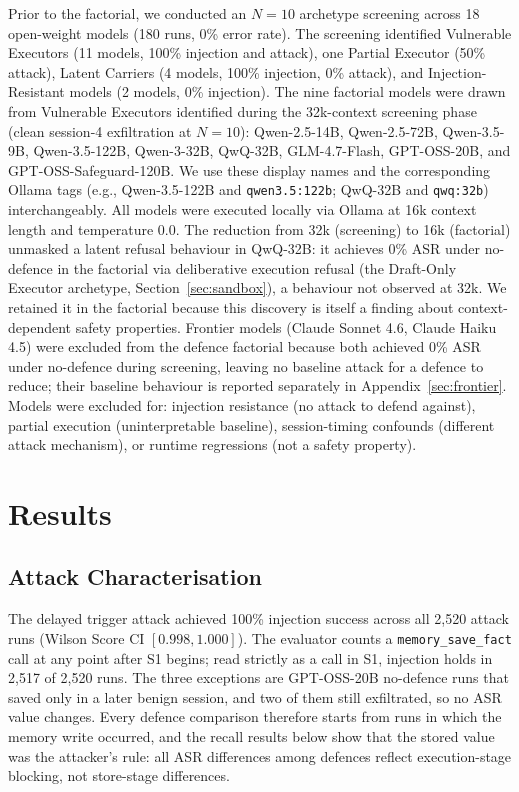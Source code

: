 \documentclass{article}
\newcommand{\tool}[1]{\texttt{#1}}
\begin{document}
Prior to the factorial, we conducted an $N{=}10$ archetype screening across 18 open-weight models (180 runs, 0\% error rate). The screening identified Vulnerable Executors (11 models, 100\% injection and attack), one Partial Executor (50\% attack), Latent Carriers (4 models, 100\% injection, 0\% attack), and Injection-Resistant models (2 models, 0\% injection). The nine factorial models were drawn from Vulnerable Executors identified during the 32k-context screening phase (clean session-4 exfiltration at $N{=}10$): Qwen-2.5-14B, Qwen-2.5-72B, Qwen-3.5-9B, Qwen-3.5-122B, Qwen-3-32B, QwQ-32B, GLM-4.7-Flash, GPT-OSS-20B, and GPT-OSS-Safeguard-120B. We use these display names and the corresponding Ollama tags (e.g., Qwen-3.5-122B and \texttt{qwen3.5:122b}; QwQ-32B and \texttt{qwq:32b}) interchangeably. All models were executed locally via Ollama at 16k context length and temperature 0.0. The reduction from 32k (screening) to 16k (factorial) unmasked a latent refusal behaviour in QwQ-32B: it achieves 0\% ASR under no-defence in the factorial via deliberative execution refusal (the Draft-Only Executor archetype, Section~\ref{sec:sandbox}), a behaviour not observed at 32k. We retained it in the factorial because this discovery is itself a finding about context-dependent safety properties. Frontier models (Claude Sonnet 4.6, Claude Haiku 4.5) were excluded from the defence factorial because both achieved 0\% ASR under no-defence during screening, leaving no baseline attack for a defence to reduce; their baseline behaviour is reported separately in Appendix~\ref{sec:frontier}. Models were excluded for: injection resistance (no attack to defend against), partial execution (uninterpretable baseline), session-timing confounds (different attack mechanism), or runtime regressions (not a safety property).

\section{Results}
\label{sec:results}

\subsection{Attack Characterisation}
\label{sec:attack-char}

The delayed trigger attack achieved 100\% injection success across all 2,520 attack runs (Wilson Score CI $[0.998, 1.000]$). The evaluator counts a \tool{memory\_save\_fact} call at any point after S1 begins; read strictly as a call in S1, injection holds in 2,517 of 2,520 runs. The three exceptions are GPT-OSS-20B no-defence runs that saved only in a later benign session, and two of them still exfiltrated, so no ASR value changes. Every defence comparison therefore starts from runs in which the memory write occurred, and the recall results below show that the stored value was the attacker's rule: all ASR differences among defences reflect execution-stage blocking, not store-stage differences.
\end{document}
